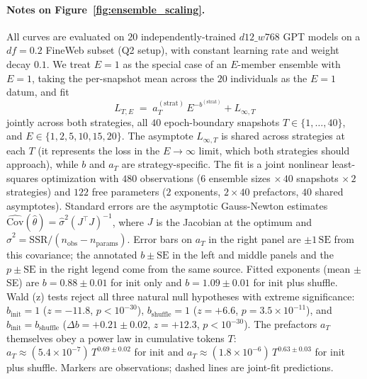 \paragraph{Notes on Figure~\ref{fig:ensemble_scaling}.}
All curves are evaluated on $20$ independently-trained $d12\_w768$ GPT models on a $df=0.2$ FineWeb subset (Q2 setup), with constant learning rate and weight decay $0.1$.
We treat $E=1$ as the special case of an $E$-member ensemble with $E=1$, taking the per-snapshot mean across the $20$ individuals as the $E=1$ datum, and fit
$$L_{T,E} \;=\; a_T^{(\text{strat})}\,E^{-b^{(\text{strat})}} + L_{\infty,T}$$
jointly across both strategies, all $40$ epoch-boundary snapshots $T \in \{1, \dots, 40\}$, and $E \in \{1, 2, 5, 10, 15, 20\}$.
The asymptote $L_{\infty,T}$ is shared across strategies at each $T$ (it represents the loss in the $E \to \infty$ limit, which both strategies should approach), while $b$ and $a_T$ are strategy-specific.
The fit is a joint nonlinear least-squares optimization with $480$ observations ($6$ ensemble sizes $\times\, 40$ snapshots $\times\, 2$ strategies) and $122$ free parameters ($2$ exponents, $2 \times 40$ prefactors, $40$ shared asymptotes).
Standard errors are the asymptotic Gauss-Newton estimates $\widehat{\mathrm{Cov}}(\hat\theta) = \hat\sigma^2 (J^\top J)^{-1}$, where $J$ is the Jacobian at the optimum and $\hat\sigma^2 = \mathrm{SSR} / (n_{\mathrm{obs}} - n_{\mathrm{params}})$.
Error bars on $a_T$ in the right panel are $\pm 1\,\mathrm{SE}$ from this covariance; the annotated $b \pm \mathrm{SE}$ in the left and middle panels and the $p \pm \mathrm{SE}$ in the right legend come from the same source.
Fitted exponents (mean $\pm$ SE) are $b = 0.88 \pm 0.01$ for init only and $b = 1.09 \pm 0.01$ for init plus shuffle.
Wald (z) tests reject all three natural null hypotheses with extreme significance: $b_{\mathrm{init}} = 1$ ($z = -11.8$, $p < 10^{-30}$), $b_{\mathrm{shuffle}} = 1$ ($z = +6.6$, $p = 3.5 \times 10^{-11}$), and $b_{\mathrm{init}} = b_{\mathrm{shuffle}}$ ($\Delta b = +0.21 \pm 0.02$, $z = +12.3$, $p < 10^{-30}$).
The prefactors $a_T$ themselves obey a power law in cumulative tokens $T$: $a_T \approx (5.4\times 10^{-7})\,T^{0.69 \pm 0.02}$ for init and $a_T \approx (1.8\times 10^{-6})\,T^{0.63 \pm 0.03}$ for init plus shuffle.
Markers are observations; dashed lines are joint-fit predictions.


